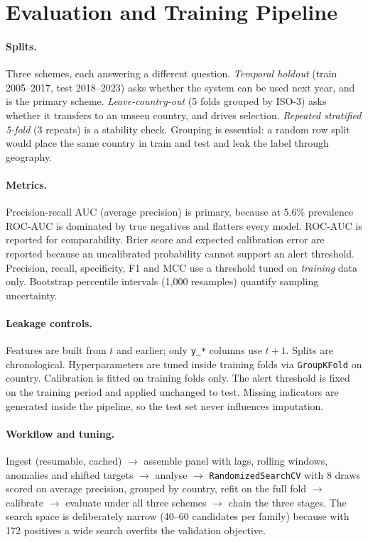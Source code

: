 \documentclass[11pt]{article}
\begin{document}
\section{Evaluation and Training Pipeline}

\paragraph{Splits.} Three schemes, each answering a different question.
\emph{Temporal holdout} (train 2005--2017, test 2018--2023) asks whether the system can be used
next year, and is the primary scheme. \emph{Leave-country-out} (5 folds grouped by ISO-3) asks
whether it transfers to an unseen country, and drives selection. \emph{Repeated stratified 5-fold}
(3 repeats) is a stability check. Grouping is essential: a random row split would place the same
country in train and test and leak the label through geography.

\paragraph{Metrics.} Precision-recall AUC (average precision) is primary, because at
5.6\% prevalence ROC-AUC is dominated by true negatives and flatters every model.
ROC-AUC is reported for comparability. Brier score and expected calibration error are reported
because an uncalibrated probability cannot support an alert threshold. Precision, recall,
specificity, F1 and MCC use a threshold tuned on \emph{training} data only. Bootstrap percentile
intervals (1{,}000 resamples) quantify sampling uncertainty.

\paragraph{Leakage controls.} Features are built from $t$ and earlier; only \texttt{y\_*}
columns use $t+1$. Splits are chronological. Hyperparameters are tuned inside training folds via
\texttt{GroupKFold} on country. Calibration is fitted on training folds only. The alert threshold
is fixed on the training period and applied unchanged to test. Missing indicators are generated
inside the pipeline, so the test set never influences imputation.

\paragraph{Workflow and tuning.} Ingest (resumable, cached) $\rightarrow$ assemble panel with
lags, rolling windows, anomalies and shifted targets $\rightarrow$ analyse $\rightarrow$
\texttt{RandomizedSearchCV} with 8 draws scored on average precision, grouped by country,
refit on the full fold $\rightarrow$ calibrate $\rightarrow$ evaluate under all three schemes
$\rightarrow$ chain the three stages. The search space is deliberately narrow (40--60 candidates
per family) because with 172 positives a wide search overfits the validation
objective.
\end{document}
